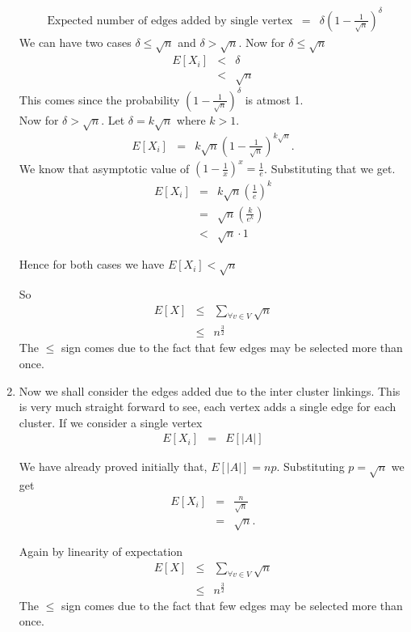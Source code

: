 \documentclass{assignment}
\begin{document}
\begin{problemlist}
\begin{problem}
\begin{answer}
\begin{enumerate}
\begin{eqnarray}
\textrm{ Expected number of edges added by single vertex} & = & \delta \left( 1 - \frac{1}{\sqrt{n}} \right) ^ \delta 
\end{eqnarray}
We can have two cases $\delta \leq \sqrt{n}$ and $\delta > \sqrt{n}$. Now for $\delta \leq \sqrt{n}$
\begin{eqnarray}
E[X_i]  & < & \delta \\
& < & \sqrt{n}
\end{eqnarray}
This comes since the probability $\left( 1 - \frac{1}{\sqrt{n}} \right) ^ \delta$ is atmost 1. \\
Now for $\delta > \sqrt{n}$. Let $\delta = k\sqrt{n}$ where $k>1$. 
\begin{eqnarray}
E[X_i] & = & k\sqrt{n} \left( 1- \frac{1}{\sqrt{n}} \right) ^ {k\sqrt{n}}. 
\end{eqnarray}
We know that asymptotic value of $\left( 1- \frac{1}{x} \right) ^x = \frac{1}{e}$. Substituting that we get. 
\begin{eqnarray}
E[X_i] & = & k\sqrt{n} \left( \frac{1}{e} \right) ^{k} \\
& = & \sqrt{n} \left( \frac{k}{e^k} \right) \\
& < & \sqrt{n}\cdot1 
\end{eqnarray}
 
Hence for both cases we have $ E[X_i]   <   \sqrt{n}$

So 
\begin{eqnarray}
E[X] & \leq & \sum_{\forall v \in V} \sqrt{n} \\
 & \leq & n^{\frac{3}{2}}
\end{eqnarray}
The $\leq$ sign comes due to the fact that few edges may be selected more than once. 


\item Now we shall consider the edges added due to the inter cluster linkings. This is very much straight forward to see, each vertex adds a single edge for each cluster. If we consider a single vertex 
\begin{eqnarray}
E[X_i] & = & E[|A|]
\end{eqnarray}

We have already proved initially that, $E[|A|]=np$. Substituting $p=\sqrt{n}$ we get
\begin{eqnarray}
E[X_i] & = & \frac{n}{\sqrt{n}}  \\
& = & \sqrt{n}.
\end{eqnarray}

Again by linearity of expectation
\begin{eqnarray}
E[X] & \leq & \sum_{\forall v \in V} \sqrt{n} \\
 & \leq & n^{\frac{3}{2}}
\end{eqnarray}
The $\leq$ sign comes due to the fact that few edges may be selected more than once. 


\end{enumerate}
\end{answer}
\end{problem}
\end{problemlist}
\end{document}

